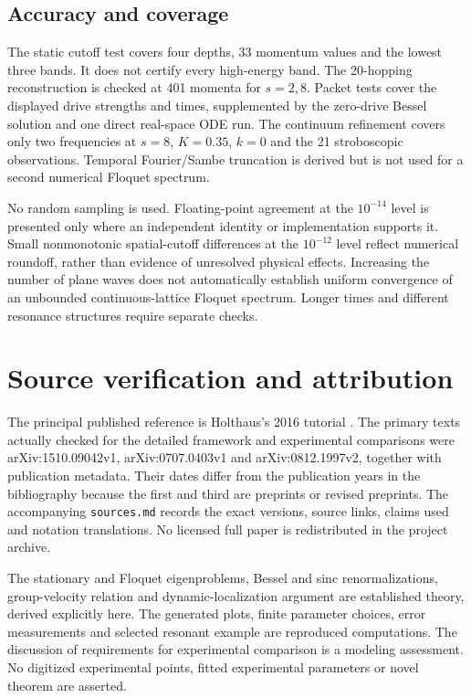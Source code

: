 \documentclass[11pt,oneside]{report}
\numberwithin{equation}{chapter}
\begin{document}
\section{Accuracy and coverage}
The static cutoff test covers four depths, 33 momentum values and the lowest three bands. It does not certify every high-energy band. The 20-hopping reconstruction is checked at 401 momenta for $s=2,8$. Packet tests cover the displayed drive strengths and times, supplemented by the zero-drive Bessel solution and one direct real-space ODE run. The continuum refinement covers only two frequencies at $s=8$, $K=0.35$, $k=0$ and the 21 stroboscopic observations. Temporal Fourier/Sambe truncation is derived but is not used for a second numerical Floquet spectrum.

No random sampling is used. Floating-point agreement at the $10^{-14}$ level is presented only where an independent identity or implementation supports it. Small nonmonotonic spatial-cutoff differences at the $10^{-12}$ level reflect numerical roundoff, rather than evidence of unresolved physical effects. Increasing the number of plane waves does not automatically establish uniform convergence of an unbounded continuous-lattice Floquet spectrum. Longer times and different resonance structures require separate checks.

\chapter{Source verification and attribution}
The principal published reference is Holthaus's 2016 tutorial \cite{Holthaus2016}. The primary texts actually checked for the detailed framework and experimental comparisons were arXiv:1510.09042v1, arXiv:0707.0403v1 and arXiv:0812.1997v2, together with publication metadata. Their dates differ from the publication years in the bibliography because the first and third are preprints or revised preprints. The accompanying \texttt{sources.md} records the exact versions, source links, claims used and notation translations. No licensed full paper is redistributed in the project archive.

The stationary and Floquet eigenproblems, Bessel and sinc renormalizations, group-velocity relation and dynamic-localization argument are established theory, derived explicitly here. The generated plots, finite parameter choices, error measurements and selected resonant example are reproduced computations. The discussion of requirements for experimental comparison is a modeling assessment. No digitized experimental points, fitted experimental parameters or novel theorem are asserted.
\end{document}
